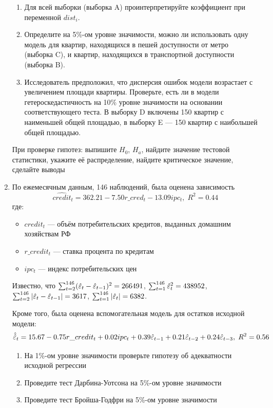 \documentclass[12pt, a4paper]{article}
\begin{document}
\begin{enumerate}
\begin{enumerate}
\item Для всей выборки (выборка A) проинтерпретируйте коэффициент при переменной $dist_i$.
\item Определите на 5\%-ом уровне значимости, можно ли использовать одну модель для квартир, находящихся в пешей доступности от метро (выборка C), и квартир, находящихся в транспортной доступности (выборка B).
\item Исследователь предположил, что дисперсия ошибок модели возрастает с увеличением площади квартиры. Проверьте, есть ли в модели гетероскедастичность на 10\% уровне значимости на основании соответствующего теста. В выборку D включены 150 квартир с наименьшей общей площадью, в выборку E — 150 квартир с наибольшей общей площадью.
\end{enumerate}

При проверке гипотез: выпишите $H_0$, $H_a$, найдите значение тестовой статистики, укажите её распределение, найдите критическое значение, сделайте выводы


\item По ежемесячным данным, 146 наблюдений, была оценена зависимость
\[
\widehat{credit}_t = 362.21-7.50 r\_cred_t-13.09 ipc_t, \; R^2=0.44
\]
где:
\begin{itemize}
\item $credit_t$ — объём потребительских кредитов, выданных домашним хозяйствам РФ
\item $r\_credit_t$ — ставка процента по кредитам
\item $ipc_t$ — индекс потребительских цен
\end{itemize}

Известно, что $\sum_{t=2}^{146} (\hat{\varepsilon}_t - \hat{\varepsilon}_{t-1})^2 = 266491$, $\sum_{t=1}^{146} \hat{\varepsilon}_t^2 = 438952$, $\sum_{t=2}^{146} |\hat{\varepsilon}_t - \hat{\varepsilon}_{t-1}| = 3617$, $\sum_{t=1}^{146} |\hat{\varepsilon}_t| = 6382$.

Кроме того, была оценена вспомогательная модель для остатков исходной модели:
\[
\hat{\hat{\varepsilon}}_t=15.67-0.75 r\_credit_t+0.02 ipc_t+0.39 \hat{\varepsilon}_{t-1}+0.21 \hat{\varepsilon}_{t-2}+0.24 \hat{\varepsilon}_{t-3}, \; R^2=0.56
\]

\begin{enumerate}
\item На 1\%-ом уровне значимости проверьте гипотезу об адекватности исходной регрессии
\item Проведите тест Дарбина-Уотсона на 5\%-ом уровне значимости
\item Проведите тест Бройша-Годфри на 5\%-ом уровне значимости
\end{enumerate}


\end{enumerate}
\end{document}

